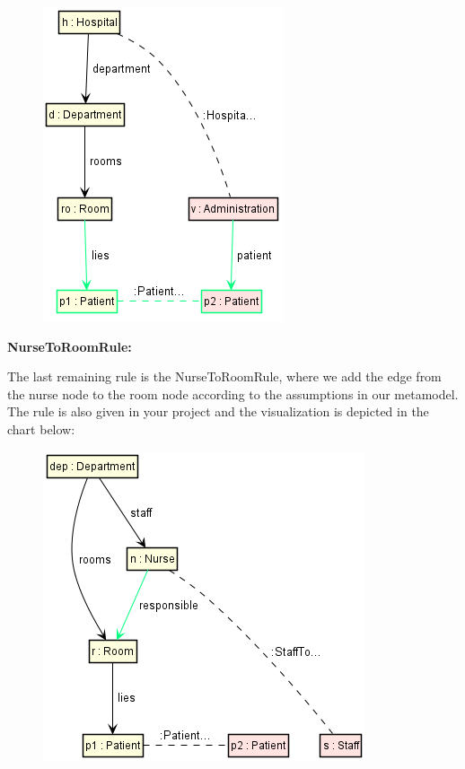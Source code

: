 {\begin{figure}[h]
    \centering
    \includegraphics[scale=0.65 ]{pictures/PatientInRoomRule.png}
    \caption{}
    \label{PatientInRoomRule}
\end{figure}

\textbf{NurseToRoomRule:}

The last remaining rule is the \textsf{NurseToRoomRule}, where we add the edge from the nurse node to the room node according to the assumptions in our metamodel. The rule is also given in your project and the visualization is depicted in the chart below:

\begin{figure}[h]
    \centering
    \includegraphics[scale=0.65 ]{pictures/NurseToRoomRule.png}
    \caption{}
    \label{PatientInRoomRule}
\end{figure}

}
